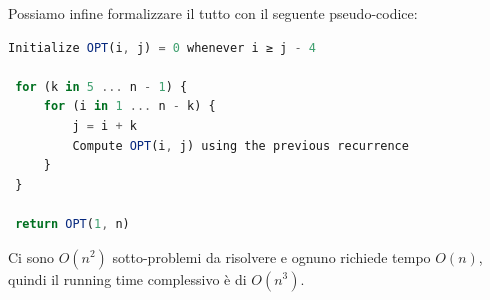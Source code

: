 Possiamo infine formalizzare il tutto con il seguente pseudo-codice:

\begin{lstlisting}[language=JavaScript]
 Initialize OPT(i, j) = 0 whenever i ≥ j - 4

 for (k in 5 ... n - 1) {
     for (i in 1 ... n - k) {
         j = i + k
         Compute OPT(i, j) using the previous recurrence
     }
 }

 return OPT(1, n)
\end{lstlisting}

Ci sono $O(n^2)$ sotto-problemi da risolvere e ognuno richiede tempo $O(n)$,
quindi il running time complessivo è di $O(n^3)$.
